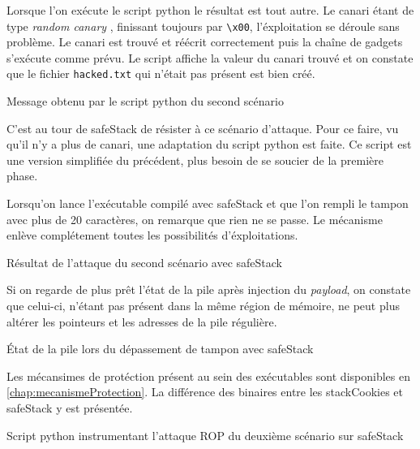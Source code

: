 Lorsque l'on exécute le script python le résultat est tout autre. Le canari étant de type
\og \textit{random canary} \fg, finissant toujours par \texttt{\textbackslash x00},
l'éxploitation se déroule sans problème. Le canari est trouvé et réécrit correctement
puis la chaîne de gadgets s'exécute comme prévu. Le script affiche la valeur du canari
trouvé et on constate que le fichier \texttt{hacked.txt} qui n'était pas présent est
bien créé.

\begin{listing}
	\caption{Message obtenu par le script python du second scénario}
	\label{lst:powned}
\end{listing}

C'est au tour de \og \gls{safeStack} \fg de résister à ce scénario d'attaque.
Pour ce faire, vu qu'il n'y a plus de canari, une adaptation du script
python est faite. Ce script est une version simplifiée du précédent, plus besoin de se
soucier de la première phase.

Lorsqu'on lance l'exécutable compilé avec \og \gls{safeStack} \fg et que l'on rempli
le tampon avec plus de 20 caractères, on remarque que rien ne se passe. Le mécanisme enlève complétement toutes les possibilités d'éxploitations.

\begin{listing}
	\caption{Résultat de l'attaque du second scénario avec \og \gls{safeStack} \fg}
	\label{lst:attackSafeStack}
\end{listing}

Si on regarde de plus prêt l'état de la pile après injection du \textit{payload}, on
constate que celui-ci, n'étant pas présent dans la même région de mémoire, ne peut
plus altérer les pointeurs et les adresses de la pile régulière.

\begin{listing}
	\caption{État de la pile lors du dépassement de tampon avec \og \gls{safeStack} \fg}
	\label{lst:stackSS}
\end{listing}

Les mécansimes de protéction présent au sein des exécutables sont disponibles en \autoref{chap:mecanismeProtection}. La différence des binaires entre les \og \gls{stackCookies} \fg et \og \gls{safeStack} \fg y est présentée.

\begin{listing}
	\caption{Script python instrumentant l'attaque ROP du deuxième scénario sur \og \gls{safeStack} \fg}
	\label{lst:exploit2}
\end{listing}

